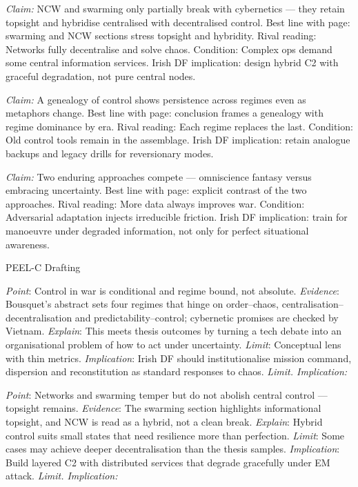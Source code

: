 \textit{Claim:} NCW and swarming only partially break with cybernetics — they retain topsight and hybridise centralised with decentralised control.
Best line with page: swarming and NCW sections stress topsight and hybridity.
Rival reading: Networks fully decentralise and solve chaos.
Condition: Complex ops demand some central information services.
Irish DF implication: design hybrid C2 with graceful degradation, not pure central nodes.

\textit{Claim:} A genealogy of control shows persistence across regimes even as metaphors change.
Best line with page: conclusion frames a genealogy with regime dominance by era.
Rival reading: Each regime replaces the last.
Condition: Old control tools remain in the assemblage.
Irish DF implication: retain analogue backups and legacy drills for reversionary modes.

\textit{Claim:} Two enduring approaches compete — omniscience fantasy versus embracing uncertainty.
Best line with page: explicit contrast of the two approaches.
Rival reading: More data always improves war.
Condition: Adversarial adaptation injects irreducible friction.
Irish DF implication: train for manoeuvre under degraded information, not only for perfect situational awareness.

PEEL-C Drafting

\textit{Point}: Control in war is conditional and regime bound, not absolute.
\textit{Evidence}: Bousquet’s abstract sets four regimes that hinge on order–chaos, centralisation–decentralisation and predictability–control; cybernetic promises are checked by Vietnam.
\textit{Explain}: This meets thesis outcomes by turning a tech debate into an organisational problem of how to act under uncertainty.
\textit{Limit}: Conceptual lens with thin metrics.
\textit{Implication}: Irish DF should institutionalise mission command, dispersion and reconstitution as standard responses to chaos.
\textit{Limit. Implication:}

\textit{Point}: Networks and swarming temper but do not abolish central control — topsight remains.
\textit{Evidence}: The swarming section highlights informational topsight, and NCW is read as a hybrid, not a clean break.
\textit{Explain}: Hybrid control suits small states that need resilience more than perfection.
\textit{Limit}: Some cases may achieve deeper decentralisation than the thesis samples.
\textit{Implication}: Build layered C2 with distributed services that degrade gracefully under EM attack.
\textit{Limit. Implication:}

